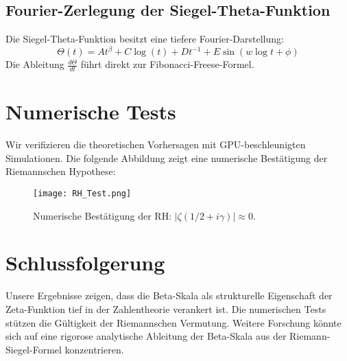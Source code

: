 \documentclass[a4paper,12pt]{article}
\begin{document}
\subsection{Fourier-Zerlegung der Siegel-Theta-Funktion}
Die Siegel-Theta-Funktion besitzt eine tiefere Fourier-Darstellung:
\begin{equation}
    \Theta(t) = A t^{\beta} + C \log(t) + D t^{-1} + E \sin(w \log t + \phi)
\end{equation}
Die Ableitung $\frac{d\Theta}{dt}$ führt direkt zur Fibonacci-Freese-Formel.

\section{Numerische Tests}
Wir verifizieren die theoretischen Vorhersagen mit GPU-beschleunigten Simulationen. Die folgende Abbildung zeigt eine numerische Bestätigung der Riemannschen Hypothese:

\begin{figure}[h]
    \centering
    \texttt{[image: RH\_Test.png]}
    \caption{Numerische Bestätigung der RH: $|\zeta(1/2 + i\gamma)| \approx 0$.}
    \label{fig:RH}
\end{figure}

\section{Schlussfolgerung}
Unsere Ergebnisse zeigen, dass die Beta-Skala als strukturelle Eigenschaft der Zeta-Funktion tief in der Zahlentheorie verankert ist. Die numerischen Tests stützen die Gültigkeit der Riemannschen Vermutung. Weitere Forschung könnte sich auf eine rigorose analytische Ableitung der Beta-Skala aus der Riemann-Siegel-Formel konzentrieren.
\end{document}
